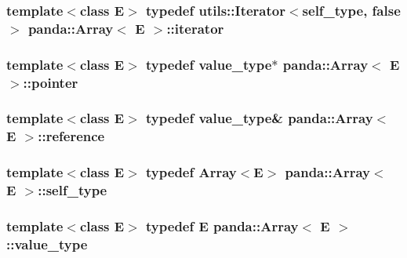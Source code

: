 \label{classpanda_1_1Array_a64dff4ee5d35a16425535f06c3e2b3e2}
\hypertarget{classpanda_1_1Array_a74a060206264533305b6ab8729b0f85c}{
\subsubsection[{iterator}]{\setlength{\rightskip}{0pt plus 5cm}template$<$class E$>$ typedef {\bf utils::Iterator}$<${\bf self\_\-type}, false$>$ {\bf panda::Array}$<$ E $>$::{\bf iterator}}}
\label{classpanda_1_1Array_a74a060206264533305b6ab8729b0f85c}
\hypertarget{classpanda_1_1Array_a14f428644ba37ca7a9d75760817e032d}{
\subsubsection[{pointer}]{\setlength{\rightskip}{0pt plus 5cm}template$<$class E$>$ typedef {\bf value\_\-type}$\ast$ {\bf panda::Array}$<$ E $>$::{\bf pointer}}}
\label{classpanda_1_1Array_a14f428644ba37ca7a9d75760817e032d}
\hypertarget{classpanda_1_1Array_a87028232d5fb96ae20e58e1a92dfe708}{
\subsubsection[{reference}]{\setlength{\rightskip}{0pt plus 5cm}template$<$class E$>$ typedef {\bf value\_\-type}\& {\bf panda::Array}$<$ E $>$::{\bf reference}}}
\label{classpanda_1_1Array_a87028232d5fb96ae20e58e1a92dfe708}
\hypertarget{classpanda_1_1Array_ad6bde3da7b6fdd2b20ae3c67973d6a33}{
\subsubsection[{self\_\-type}]{\setlength{\rightskip}{0pt plus 5cm}template$<$class E$>$ typedef {\bf Array}$<$E$>$ {\bf panda::Array}$<$ E $>$::{\bf self\_\-type}}}
\label{classpanda_1_1Array_ad6bde3da7b6fdd2b20ae3c67973d6a33}
\hypertarget{classpanda_1_1Array_a1d3ff416a3960c4cb7a619df25d32359}{
\subsubsection[{value\_\-type}]{\setlength{\rightskip}{0pt plus 5cm}template$<$class E$>$ typedef E {\bf panda::Array}$<$ E $>$::{\bf value\_\-type}}}
\label{classpanda_1_1Array_a1d3ff416a3960c4cb7a619df25d32359}


